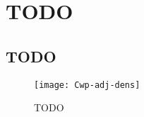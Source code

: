 \section{TODO}
\subsection{TODO}
\begin{figure}[h]
  \centering
  \texttt{[image: Cwp-adj-dens]}
  \caption{TODO}
  \label{fig:Cwp.adj.dens}
\end{figure}
